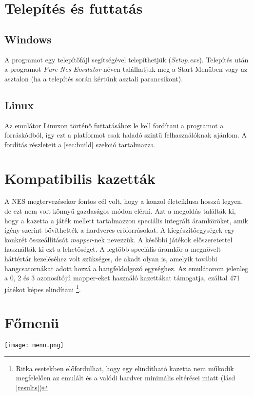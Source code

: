 \section{Telepítés és futtatás}

\subsection{Windows}
A programot egy telepítőfájl segítségével telepíthetjük (\emph{Setup.exe}).
Telepítés után a programot \emph{Pure Nes Emulator} néven találhatjuk meg a Start Menüben vagy az asztalon (ha a telepítés során kértünk asztali parancsikont).

\subsection{Linux}
Az emulátor Linuxon történő futtatásához le kell fordítani a programot a forráskódból, így ezt a platformot csak haladó szintű felhasználóknak ajánlom.
A fordítás részleteit a \ref{sec:build} szekció tartalmazza.

\section{Kompatibilis kazetták}

A NES megtervezésekor fontos cél volt, hogy a konzol életciklusa hosszú legyen, de ezt nem volt könnyű gazdaságos módon elérni. Azt a megoldás találták ki, hogy a kazetta a játék mellett tartalmazzon speciális integrált áramköröket, amik igény szerint bővíthették a hardveres erőforrásokat. A kiegészítőegységek egy konkrét összeállítását \emph{mapper}-nek nevezzük. A későbbi játékok előszeretettel használták ki ezt a lehetőséget. A legtöbb speciális áramkör a megnövelt háttértár kezeléséhez volt szükséges, de akadt olyan is, amelyik további hangcsatornákat adott hozzá a hangfeldolgozó egységhez. Az emulátorom jelenleg a 0, 2 és 3 azonosítójú mapper-eket használó kazettákat támogatja, ezáltal 471 játékot \cite{romlist} képes elindítani \footnote{Ritka esetekben előfordulhat, hogy egy elindítható kazetta nem működik megfelelően az emulált és a valódi hardver minimális eltérései miatt (lásd \ref{results})}.

\section{Főmenü}

\begin{center}
	\texttt{[image: menu.png]}
\end{center}
\vspace{0.2cm}
